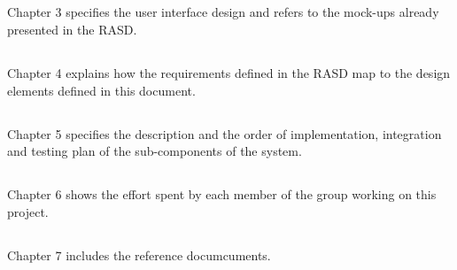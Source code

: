         \subsection*{}
        Chapter 3 specifies the user interface design and refers to the mock-ups
        already presented in the RASD.

        \subsection*{}
        Chapter 4 explains how the requirements defined in the RASD map to the
        design elements defined in this document.

        \subsection*{}
        Chapter 5 specifies the description and the order of implementation,
        integration and testing plan of the sub-components of the system.
        
        \subsection*{}
        Chapter 6 shows the effort spent by each member of the group working on
        this project.
    
        \subsection*{}
        Chapter 7 includes the reference documcuments.
        
